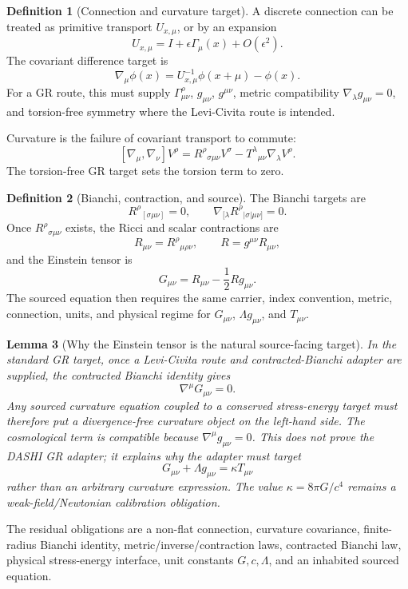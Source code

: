 \documentclass[11pt]{article}
\theoremstyle{definition}
\newtheorem{definition}{Definition}[section]
\theoremstyle{plain}
\newtheorem{lemma}[definition]{Lemma}
\theoremstyle{remark}
\begin{document}
\begin{definition}[Connection and curvature target]
A discrete connection can be treated as primitive transport \(U_{x,\mu}\), or
by an expansion
\[
U_{x,\mu}=I+\epsilon\Gamma_\mu(x)+O(\epsilon^2).
\]
The covariant difference target is
\[
\nabla_\mu\phi(x)=U_{x,\mu}^{-1}\phi(x+\mu)-\phi(x).
\]
For a GR route, this must supply \(\Gamma^\rho_{\mu\nu}\), \(g_{\mu\nu}\),
\(g^{\mu\nu}\), metric compatibility \(\nabla_\lambda g_{\mu\nu}=0\), and
torsion-free symmetry where the Levi-Civita route is intended.

Curvature is the failure of covariant transport to commute:
\[
[\nabla_\mu,\nabla_\nu]V^\rho
=
R^\rho{}_{\sigma\mu\nu}V^\sigma
-T^\lambda{}_{\mu\nu}\nabla_\lambda V^\rho.
\]
The torsion-free GR target sets the torsion term to zero.
\end{definition}

\begin{definition}[Bianchi, contraction, and source]
The Bianchi targets are
\[
R^\rho{}_{[\sigma\mu\nu]}=0,
\qquad
\nabla_{[\lambda}R^\rho{}_{|\sigma|\mu\nu]}=0.
\]
Once \(R^\rho{}_{\sigma\mu\nu}\) exists, the Ricci and scalar contractions are
\[
R_{\mu\nu}=R^\rho{}_{\mu\rho\nu},
\qquad
R=g^{\mu\nu}R_{\mu\nu},
\]
and the Einstein tensor is
\[
G_{\mu\nu}=R_{\mu\nu}-\frac12 Rg_{\mu\nu}.
\]
The sourced equation then requires the same carrier, index convention, metric,
connection, units, and physical regime for \(G_{\mu\nu}\), \(\Lambda
g_{\mu\nu}\), and \(T_{\mu\nu}\).
\end{definition}

\begin{lemma}[Why the Einstein tensor is the natural source-facing target]
In the standard GR target, once a Levi-Civita route and contracted-Bianchi
adapter are supplied, the contracted Bianchi identity gives
\[
\nabla^\mu G_{\mu\nu}=0.
\]
Any sourced curvature equation coupled to a conserved stress-energy target
must therefore put a divergence-free curvature object on the left-hand side.
The cosmological term is compatible because \(\nabla^\mu g_{\mu\nu}=0\). This
does not prove the DASHI GR adapter; it explains why the adapter must target
\[
G_{\mu\nu}+\Lambda g_{\mu\nu}=\kappa T_{\mu\nu}
\]
rather than an arbitrary curvature expression. The value
\(\kappa=8\pi G/c^4\) remains a weak-field/Newtonian calibration obligation.
\end{lemma}

The residual obligations are a non-flat connection, curvature covariance,
finite-radius Bianchi identity, metric/inverse/contraction laws, contracted
Bianchi law, physical stress-energy interface, unit constants \(G,c,\Lambda\),
and an inhabited sourced equation.
\end{document}
